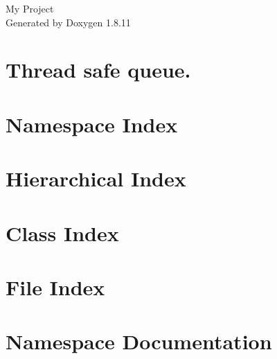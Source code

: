 \documentclass[twoside]{book}
\newcommand{\+}{\discretionary{\mbox{\scriptsize$\hookleftarrow$}}{}{}}
\newcommand{\clearemptydoublepage}{%
  \newpage{\pagestyle{empty}\cleardoublepage}%
}
\begin{document}
\hypersetup{pageanchor=false,
             bookmarksnumbered=true,
             pdfencoding=unicode
            }
\begin{titlepage}
\vspace*{7cm}
\begin{center}%
{\Large My Project }\\
\vspace*{1cm}
{\large Generated by Doxygen 1.8.11}\\
\end{center}
\end{titlepage}
\clearemptydoublepage
\tableofcontents
\clearemptydoublepage
{}
\hypersetup{pageanchor=true}

\chapter{Thread safe queue.}
\label{md_project_Readme}
\hypertarget{md_project_Readme}{}

\chapter{Namespace Index}

\chapter{Hierarchical Index}

\chapter{Class Index}

\chapter{File Index}

\chapter{Namespace Documentation}


\end{document}
